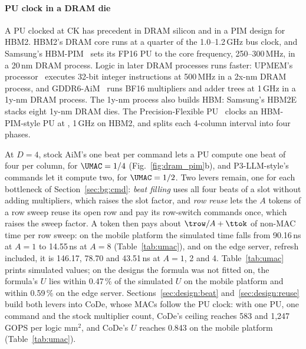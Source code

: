 \paragraph{PU clock in a DRAM die}
A PU clocked at CK has precedent in DRAM silicon and in a PIM design for HBM2. HBM2's DRAM core runs at a quarter of
the 1.0--1.2\,GHz bus clock, and Samsung's HBM-PIM~\cite{hbmpim} sets its FP16 PU to the core frequency,
250--300\,MHz, in a 20\,nm DRAM process. Logic in later DRAM processes runs faster: UPMEM's processor~\cite{devaux}
executes 32-bit integer instructions at 500\,MHz in a 2x-nm DRAM process, and GDDR6-AiM~\cite{aimjssc} runs BF16
multipliers and adder trees at 1\,GHz in a 1y-nm DRAM process. The 1y-nm process also builds HBM: Samsung's
HBM2E~\cite{flashbolt} stacks eight 1y-nm DRAM dies. The Precision-Flexible PU~\cite{pfpu} clocks an HBM-PIM-style
PU at \tck, 1\,GHz on HBM2, and splits each 4-\tck column interval into four phases.

At $D = 4$, stock AiM's one beat per command lets a PU compute one beat of four per column, for $\UMAC = 1/4$
(Fig.~\ref{fig:dram_pim}b), and P3-LLM-style's commands let it compute two, for $\UMAC = 1/2$. Two levers remain,
one for each bottleneck of Section~\ref{sec:bg:cmd}: \emph{beat filling} uses all four beats of a slot without
adding multipliers, which raises the slot factor, and \emph{row reuse} lets the $A$ tokens of a row sweep reuse its
open row and pay its row-switch commands once, which raises the sweep factor. A token then pays about $\trow / A + \ttok$ of
non-MAC time per row sweep: on the mobile platform the simulated time falls from 90.16\,ns at $A = 1$ to 14.55\,ns at
$A = 8$ (Table~\ref{tab:umac}), and on the edge server, refresh included, it is 146.17, 78.70 and 43.51\,ns at $A = 1$,
2 and 4. Table~\ref{tab:umac} prints simulated values; on the designs the formula was not fitted on, the formula's $U$
lies within 0.47\,\% of the simulated $U$ on the mobile platform and within 0.59\,\% on the edge server. Sections~\ref{sec:design:beat} and~\ref{sec:design:reuse} build both levers into CoDe, whose MACs follow
the PU clock: with one PU, one command and the stock multiplier count, CoDe's ceiling reaches 583 and 1,247\,GOPS per logic
mm$^2$, and CoDe's $U$ reaches 0.843 on the mobile platform (Table~\ref{tab:umac}).
